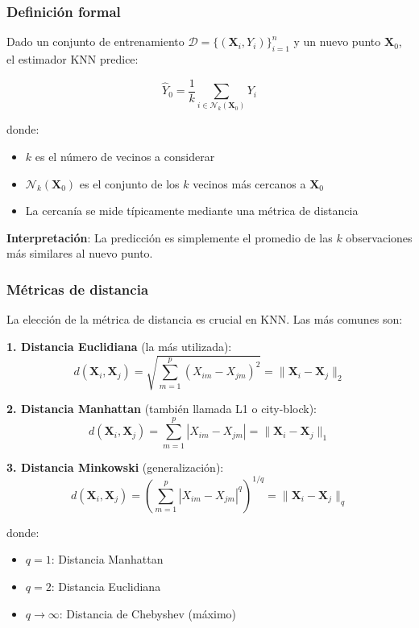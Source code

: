 \documentclass[
  doc,
  floatsintext,
  longtable,
  a4paper,
  nolmodern,
  notxfonts,
  notimes,
  12pt,
  colorlinks=true,linkcolor=blue,citecolor=blue,urlcolor=blue]{apa7}
\providecommand{\tightlist}{%
  \setlength{\itemsep}{0pt}\setlength{\parskip}{0pt}}
\begin{document}
\subsubsection{Definición formal}\label{definiciuxf3n-formal}

Dado un conjunto de entrenamiento
\(\mathcal{D} = \{(\mathbf{X}_i, Y_i)\}_{i=1}^{n}\) y un nuevo punto
\(\mathbf{X}_0\), el estimador KNN predice:

\[
\hat{Y}_0 = \frac{1}{k} \sum_{i \in \mathcal{N}_k(\mathbf{X}_0)} Y_i
\]

donde:

\begin{itemize}
\tightlist
\item
  \(k\) es el número de vecinos a considerar
\item
  \(\mathcal{N}_k(\mathbf{X}_0)\) es el conjunto de los \(k\) vecinos
  más cercanos a \(\mathbf{X}_0\)
\item
  La cercanía se mide típicamente mediante una métrica de distancia
\end{itemize}

\textbf{Interpretación}: La predicción es simplemente el promedio de las
\(k\) observaciones más similares al nuevo punto.

\subsubsection{Métricas de distancia}\label{muxe9tricas-de-distancia}

La elección de la métrica de distancia es crucial en KNN. Las más
comunes son:

\textbf{1. Distancia Euclidiana} (la más utilizada): \[
d(\mathbf{X}_i, \mathbf{X}_j) = \sqrt{\sum_{m=1}^{p} (X_{im} - X_{jm})^2} = \|\mathbf{X}_i - \mathbf{X}_j\|_2
\]

\textbf{2. Distancia Manhattan} (también llamada L1 o city-block): \[
d(\mathbf{X}_i, \mathbf{X}_j) = \sum_{m=1}^{p} |X_{im} - X_{jm}| = \|\mathbf{X}_i - \mathbf{X}_j\|_1
\]

\textbf{3. Distancia Minkowski} (generalización): \[
d(\mathbf{X}_i, \mathbf{X}_j) = \left(\sum_{m=1}^{p} |X_{im} - X_{jm}|^q\right)^{1/q} = \|\mathbf{X}_i - \mathbf{X}_j\|_q
\]

donde:

\begin{itemize}
\tightlist
\item
  \(q = 1\): Distancia Manhattan
\item
  \(q = 2\): Distancia Euclidiana
\item
  \(q \to \infty\): Distancia de Chebyshev (máximo)
\end{itemize}
\end{document}

